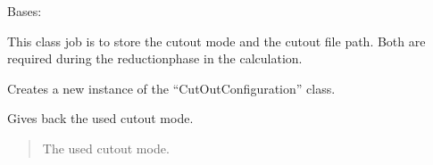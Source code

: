 \documentclass[letterpaper,10pt,english]{sphinxmanual}
\begin{document}
\begin{fulllineitems}
\label{\detokenize{apidoc/src.osm_configurator.model.project.configuration:src.osm_configurator.model.project.configuration.cut_out_configuration.CutOutConfiguration}}
\pysigstartsignatures
{}
\pysigstopsignatures
\sphinxAtStartPar
Bases: 

\sphinxAtStartPar
This class job is to store the cut\sphinxhyphen{}out mode and the cut\sphinxhyphen{}out file path. Both are required during the reduction\sphinxhyphen{}phase
in the calculation.

\begin{fulllineitems}
\label{\detokenize{apidoc/src.osm_configurator.model.project.configuration:src.osm_configurator.model.project.configuration.cut_out_configuration.CutOutConfiguration.__init__}}
\pysigstartsignatures
{}
\pysigstopsignatures
\sphinxAtStartPar
Creates a new instance of the “CutOutConfiguration” class.

\end{fulllineitems}


\begin{fulllineitems}
\label{\detokenize{apidoc/src.osm_configurator.model.project.configuration:src.osm_configurator.model.project.configuration.cut_out_configuration.CutOutConfiguration.get_cut_out_mode}}
\pysigstartsignatures
{}
\pysigstopsignatures
\sphinxAtStartPar
Gives back the used cut\sphinxhyphen{}out mode.
\begin{quote}\begin{description}
\sphinxAtStartPar
The used cut\sphinxhyphen{}out mode.

\sphinxAtStartPar
{\hyperref[\detokenize{apidoc/src.osm_configurator.model.project.configuration:src.osm_configurator.model.project.configuration.cut_out_mode_enum.CutOutMode}]{}}


\end{description}
\end{quote}
\end{fulllineitems}
\end{fulllineitems}
\end{document}
